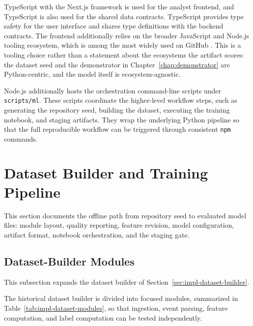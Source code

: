 TypeScript with the Next.js framework is used for the analyst frontend, and TypeScript is also used for the shared data contracts. TypeScript provides type safety for the user interface and shares type definitions with the backend contracts. The frontend additionally relies on the broader JavaScript and Node.js tooling ecosystem, which is among the most widely used on GitHub \cite{github_language_stats}. This is a tooling choice rather than a statement about the ecosystems the artifact scores: the dataset seed and the demonstrator in Chapter~\ref{chap:demonstrator} are Python-centric, and the model itself is ecosystem-agnostic.

Node.js additionally hosts the orchestration command-line scripts under \texttt{scripts/ml}. These scripts coordinate the higher-level workflow steps, such as generating the repository seed, building the dataset, executing the training notebook, and staging artifacts. They wrap the underlying Python pipeline so that the full reproducible workflow can be triggered through consistent \texttt{npm} commands.

\section{Dataset Builder and Training Pipeline}
\label{appendix:impl-pipeline}

This section documents the offline path from repository seed to evaluated model
files: module layout, quality reporting, feature revision, model configuration,
artifact format, notebook orchestration, and the staging gate.

\subsection{Dataset-Builder Modules}
\label{sec:impl-dataset-modules}

This subsection expands the dataset builder of Section~\ref{sec:impl-dataset-builder}.

The historical dataset builder is divided into focused modules, summarized in Table~\ref{tab:impl-dataset-modules}, so that ingestion, event parsing, feature computation, and label computation can be tested independently.

